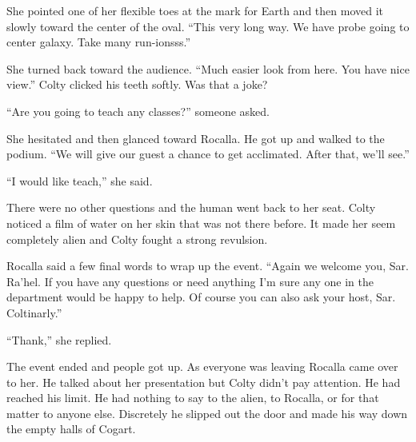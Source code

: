 She pointed one of her flexible toes at the mark for Earth and then moved it slowly toward the
center of the oval. ``This very long way. We have probe going to center galaxy. Take many
run-ionsss.''

She turned back toward the audience. ``Much easier look from here. You have nice view.''
Colty clicked his teeth softly. Was that a joke?

``Are you going to teach any classes?'' someone asked.

She hesitated and then glanced toward Rocalla. He got up and walked to the podium. ``We will
give our guest a chance to get acclimated. After that, we'll see.''

``I would like teach,'' she said.

There were no other questions and the human went back to her seat. Colty noticed a film of water
on her skin that was not there before. It made her seem completely alien and Colty fought a
strong revulsion.

Rocalla said a few final words to wrap up the event. ``Again we welcome you, Sar. Ra'hel. If you
have any questions or need anything I'm sure any one in the department would be happy to help.
Of course you can also ask your host, Sar. Coltinarly.''

``Thank,'' she replied.

The event ended and people got up. As everyone was leaving Rocalla came over to her. He talked
about her presentation but Colty didn't pay attention. He had reached his limit. He had nothing
to say to the alien, to Rocalla, or for that matter to anyone else. Discretely he slipped out
the door and made his way down the empty halls of Cogart.
